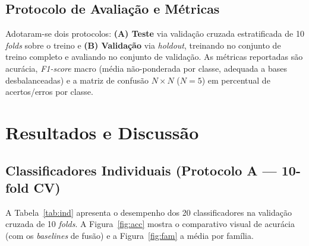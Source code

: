 \documentclass[12pt]{article}
\begin{document}
\subsection{Protocolo de Avaliação e Métricas}

Adotaram-se dois protocolos: \textbf{(A) Teste} via validação cruzada
estratificada de 10 \textit{folds} sobre o treino e \textbf{(B) Validação} via
\textit{holdout}, treinando no conjunto de treino completo e avaliando no
conjunto de validação. As métricas reportadas são acurácia, \textit{F1-score}
macro (média não-ponderada por classe, adequada a bases desbalanceadas) e a
matriz de confusão $N\times N$ ($N=5$) em percentual de acertos/erros por classe.

\section{Resultados e Discussão}

\subsection{Classificadores Individuais (Protocolo A --- 10-fold CV)}

A Tabela~\ref{tab:ind} apresenta o desempenho dos 20 classificadores na validação
cruzada de 10 \textit{folds}. A Figura~\ref{fig:acc} mostra o comparativo visual
de acurácia (com os \textit{baselines} de fusão) e a Figura~\ref{fig:fam} a média
por família.
\end{document}
